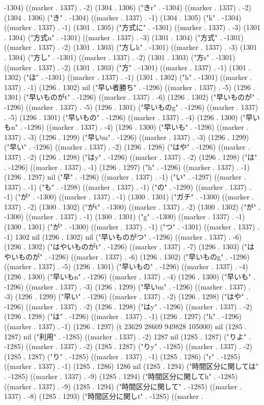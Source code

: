 -1304) ((marker . 1337) . -2) (1304 . 1306) ("きr" . -1304) ((marker . 1337) . -2) (1304 . 1306) ("き" . -1304) ((marker . 1337) . -1) (1304 . 1305) ("k" . -1304) ((marker . 1337) . -1) (1301 . 1305) ("方式に" . -1301) ((marker . 1337) . -3) (1301 . 1304) ("方式n" . -1301) ((marker . 1337) . -3) (1301 . 1304) ("方式" . -1301) ((marker . 1337) . -2) (1301 . 1303) ("方しk" . -1301) ((marker . 1337) . -3) (1301 . 1304) ("方し" . -1301) ((marker . 1337) . -2) (1301 . 1303) ("方s" . -1301) ((marker . 1337) . -2) (1301 . 1303) ("方" . -1301) ((marker . 1337) . -1) (1301 . 1302) ("ほ" . -1301) ((marker . 1337) . -1) (1301 . 1302) ("h" . -1301) ((marker . 1337) . -1) (1296 . 1302) nil ("早い者勝ち" . -1296) ((marker . 1337) . -5) (1296 . 1301) ("早いものがt" . -1296) ((marker . 1337) . -6) (1296 . 1302) ("早いものが" . -1296) ((marker . 1337) . -5) (1296 . 1301) ("早いものg" . -1296) ((marker . 1337) . -5) (1296 . 1301) ("早いもの" . -1296) ((marker . 1337) . -4) (1296 . 1300) ("早いもn" . -1296) ((marker . 1337) . -4) (1296 . 1300) ("早いも" . -1296) ((marker . 1337) . -3) (1296 . 1299) ("早いm" . -1296) ((marker . 1337) . -3) (1296 . 1299) ("早い" . -1296) ((marker . 1337) . -2) (1296 . 1298) ("はや" . -1296) ((marker . 1337) . -2) (1296 . 1298) ("はy" . -1296) ((marker . 1337) . -2) (1296 . 1298) ("は" . -1296) ((marker . 1337) . -1) (1296 . 1297) ("h" . -1296) ((marker . 1337) . -1) (1296 . 1297) nil ("早" . -1296) ((marker . 1337) . -1) ("い" . -1297) ((marker . 1337) . -1) ("も" . -1298) ((marker . 1337) . -1) ("の" . -1299) ((marker . 1337) . -1) ("が" . -1300) ((marker . 1337) . -1) (1300 . 1301) ("ガチ" . -1300) ((marker . 1337) . -2) (1300 . 1302) ("がt" . -1300) ((marker . 1337) . -2) (1300 . 1302) ("が" . -1300) ((marker . 1337) . -1) (1300 . 1301) ("g" . -1300) ((marker . 1337) . -1) (1300 . 1301) ("が" . -1300) ((marker . 1337) . -1) ("つ" . -1301) ((marker . 1337) . -1) 1302 nil (1296 . 1302) nil ("早いものがつ" . -1296) ((marker . 1337) . -6) (1296 . 1302) ("はやいものがt" . -1296) ((marker . 1337) . -7) (1296 . 1303) ("はやいものが" . -1296) ((marker . 1337) . -6) (1296 . 1302) ("早いものg" . -1296) ((marker . 1337) . -5) (1296 . 1301) ("早いもの" . -1296) ((marker . 1337) . -4) (1296 . 1300) ("早いもn" . -1296) ((marker . 1337) . -4) (1296 . 1300) ("早いも" . -1296) ((marker . 1337) . -3) (1296 . 1299) ("早いm" . -1296) ((marker . 1337) . -3) (1296 . 1299) ("早い" . -1296) ((marker . 1337) . -2) (1296 . 1298) ("はや" . -1296) ((marker . 1337) . -2) (1296 . 1298) ("はy" . -1296) ((marker . 1337) . -2) (1296 . 1298) ("は" . -1296) ((marker . 1337) . -1) (1296 . 1297) ("h" . -1296) ((marker . 1337) . -1) (1296 . 1297) (t 23629 28609 949828 105000) nil (1285 . 1287) nil ("利用" . -1285) ((marker . 1337) . -2) 1287 nil (1285 . 1287) ("りよ" . -1285) ((marker . 1337) . -2) (1285 . 1287) ("りy" . -1285) ((marker . 1337) . -2) (1285 . 1287) ("り" . -1285) ((marker . 1337) . -1) (1285 . 1286) ("r" . -1285) ((marker . 1337) . -1) (1285 . 1286) 1286 nil (1285 . 1294) ("時間区分に関しては" . -1285) ((marker . 1337) . -9) (1285 . 1294) ("時間区分に関してh" . -1285) ((marker . 1337) . -9) (1285 . 1294) ("時間区分に関して" . -1285) ((marker . 1337) . -8) (1285 . 1293) ("時間区分に関しt" . -1285) ((marker . 